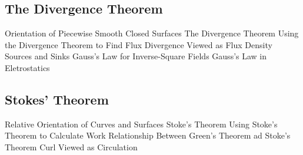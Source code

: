 \documentclass[]{article}
\begin{document}
\subsection{The Divergence Theorem}
Orientation of Piecewise Smooth Closed Surfaces
The Divergence Theorem
Using the Divergence Theorem to Find Flux
Divergence Viewed as Flux Density
Sources and Sinks
Gauss's Law for Inverse-Square Fields
Gauss's Law in Eletrostatics
\subsection{Stokes' Theorem}
Relative Orientation of Curves and Surfaces
Stoke's Theorem
Using Stoke's Theorem to Calculate Work
Relationship Between Green's Theorem ad Stoke's Theorem
Curl Viewed as Circulation
\end{document}
